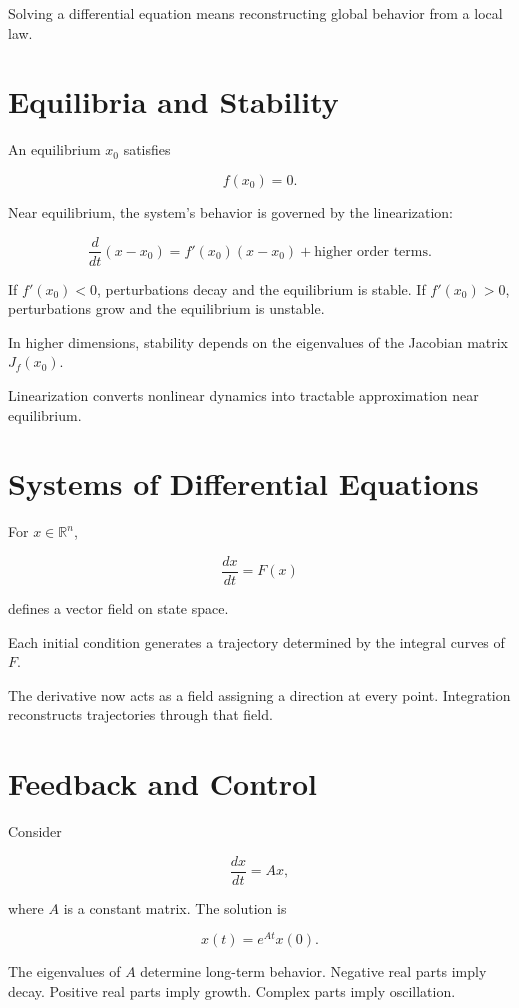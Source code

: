 \documentclass[12pt]{book}
\begin{document}
Solving a differential equation means reconstructing global behavior from a local law.

\section{Equilibria and Stability}

An equilibrium $x_0$ satisfies

\[
f(x_0) = 0.
\]

Near equilibrium, the system's behavior is governed by the linearization:

\[
\frac{d}{dt} (x - x_0) = f'(x_0)(x - x_0) + \text{higher order terms}.
\]

If $f'(x_0) < 0$, perturbations decay and the equilibrium is stable. If $f'(x_0) > 0$, perturbations grow and the equilibrium is unstable.

In higher dimensions, stability depends on the eigenvalues of the Jacobian matrix $J_f(x_0)$.

Linearization converts nonlinear dynamics into tractable approximation near equilibrium.

\section{Systems of Differential Equations}

For $x \in \mathbb{R}^n$,

\[
\frac{dx}{dt} = F(x)
\]

defines a vector field on state space.

Each initial condition generates a trajectory determined by the integral curves of $F$.

The derivative now acts as a field assigning a direction at every point. Integration reconstructs trajectories through that field.

\section{Feedback and Control}

Consider

\[
\frac{dx}{dt} = Ax,
\]

where $A$ is a constant matrix. The solution is

\[
x(t) = e^{At} x(0).
\]

The eigenvalues of $A$ determine long-term behavior. Negative real parts imply decay. Positive real parts imply growth. Complex parts imply oscillation.
\end{document}
